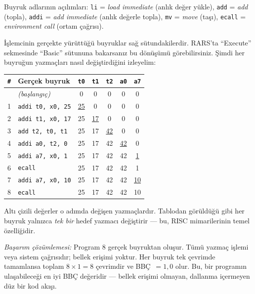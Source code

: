 \begin{ornek}[4.1]
\begin{center}
Buyruk adlarının açılımları: \texttt{li} = \emph{load immediate} (anlık değer yükle), \texttt{add} = \emph{add} (topla), \texttt{addi} = \emph{add immediate} (anlık değerle topla), \texttt{mv} = \emph{move} (taşı), \texttt{ecall} = \emph{environment call} (ortam çağrısı).
\end{center}

İşlemcinin gerçekte yürüttüğü buyruklar sağ sütundakilerdir. RARS'ta ``Execute'' sekmesinde ``Basic'' sütununa bakarsanız bu dönüşümü görebilirsiniz. Şimdi her buyruğun yazmaçları nasıl değiştirdiğini izleyelim:

\begin{center}
\small
\begin{tabular}{clccccc}
\toprule
\texttt{\#} & Gerçek buyruk & \texttt{t0} & \texttt{t1} & \texttt{t2} & \texttt{a0} & \texttt{a7} \\
\midrule
  & \emph{(başlangıç)} & 0 & 0 & 0 & 0 & 0 \\
1 & \texttt{addi t0, x0, 25} & \underline{25} & 0 & 0 & 0 & 0 \\
2 & \texttt{addi t1, x0, 17} & 25 & \underline{17} & 0 & 0 & 0 \\
3 & \texttt{add t2, t0, t1}  & 25 & 17 & \underline{42} & 0 & 0 \\
4 & \texttt{addi a0, t2, 0}  & 25 & 17 & 42 & \underline{42} & 0 \\
5 & \texttt{addi a7, x0, 1}  & 25 & 17 & 42 & 42 & \underline{1} \\
6 & \texttt{ecall}            & 25 & 17 & 42 & 42 & 1 \\
7 & \texttt{addi a7, x0, 10} & 25 & 17 & 42 & 42 & \underline{10} \\
8 & \texttt{ecall}            & 25 & 17 & 42 & 42 & 10 \\
\bottomrule
\end{tabular}
\end{center}

Altı çizili değerler o adımda değişen yazmaçlardır. Tablodan görüldüğü gibi her buyruk yalnızca \emph{tek bir} hedef yazmacı değiştirir --- bu, RISC mimarilerinin temel özelliğidir.

\emph{Başarım çözümlemesi:} Program 8 gerçek buyruktan oluşur. Tümü yazmaç işlemi veya sistem çağrısıdır; bellek erişimi yoktur. Her buyruk tek çevrimde tamamlansa toplam $8 \times 1 = 8$ çevrimdir ve BBÇ~$= 1{,}0$ olur. Bu, bir programın ulaşabileceği en iyi BBÇ değeridir --- bellek erişimi olmayan, dallanma içermeyen düz bir kod akışı.
\end{ornek}

